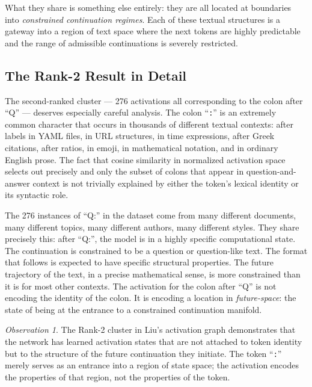 \documentclass[12pt, a4paper]{article}
\theoremstyle{plain}
\theoremstyle{definition}
\theoremstyle{remark}
\newtheorem{observation}[theorem]{Observation}
\begin{document}
What they share is something else entirely: they are all located at boundaries
into \emph{constrained continuation regimes}. Each of these textual structures
is a gateway into a region of text space where the next tokens are highly
predictable and the range of admissible continuations is severely restricted.

\subsection{The Rank-2 Result in Detail}

The second-ranked cluster --- 276 activations all corresponding to the colon
after ``Q'' --- deserves especially careful analysis. The colon ``\texttt{:}''
is an extremely common character that occurs in thousands of different textual
contexts: after labels in YAML files, in URL structures, in time expressions,
after Greek citations, after ratios, in emoji, in mathematical notation, and
in ordinary English prose. The fact that cosine similarity in normalized
activation space selects out precisely and only the subset of colons that appear
in question-and-answer context is not trivially explained by either the
token's lexical identity or its syntactic role.

The 276 instances of ``Q:'' in the dataset come from many different documents,
many different topics, many different authors, many different styles. They share
precisely this: after ``Q:'', the model is in a highly specific
computational state. The continuation is constrained to be a question or
question-like text. The format that follows is expected to have specific
structural properties. The future trajectory of the text, in a precise
mathematical sense, is more constrained than it is for most other contexts.
The activation for the colon after ``Q'' is not encoding the identity of the
colon. It is encoding a location in \emph{future-space}: the state of being
at the entrance to a constrained continuation manifold.

\begin{observation}
  The Rank-2 cluster in Liu's activation graph demonstrates that the network
  has learned activation states that are not attached to token identity but to
  the structure of the future continuation they initiate. The token ``\texttt{:}''
  merely serves as an entrance into a region of state space; the activation
  encodes the properties of that region, not the properties of the token.
\end{observation}
\end{document}
